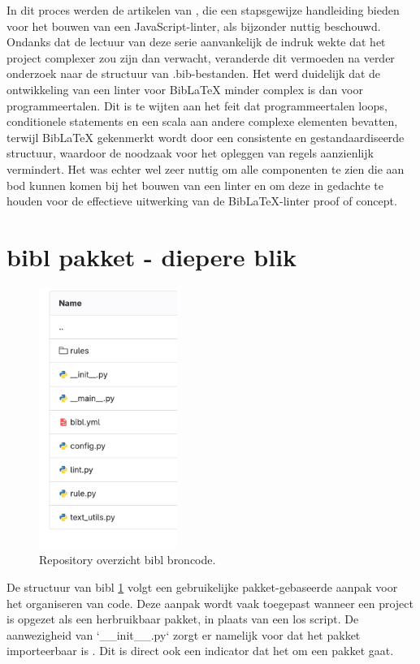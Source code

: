 In dit proces werden de artikelen van \textcite{BorgesLate2021}, die een stapsgewijze handleiding bieden voor het bouwen van een JavaScript-linter, als bijzonder nuttig beschouwd. Ondanks dat de lectuur van deze serie aanvankelijk de indruk wekte dat het project complexer zou zijn dan verwacht, veranderde dit vermoeden na verder onderzoek naar de structuur van .bib-bestanden. Het werd duidelijk dat de ontwikkeling van een linter voor BibLaTeX minder complex is dan voor programmeertalen. Dit is te wijten aan het feit dat programmeertalen loops, conditionele statements en een scala aan andere complexe elementen bevatten, terwijl BibLaTeX gekenmerkt wordt door een consistente en gestandaardiseerde structuur, waardoor de noodzaak voor het opleggen van regels aanzienlijk vermindert. Het was echter wel zeer nuttig om alle componenten te zien die aan bod kunnen komen bij het bouwen van een linter en om deze in gedachte te houden voor de effectieve uitwerking van de BibLaTeX-linter proof of concept.


\section{bibl pakket - diepere blik}
\label{sec:bibl-in-depth}
\begin{figure}[ht]
    \centering
    \includegraphics[width=0.4\textwidth]{./files/bibl_src.png}
    \caption[bibl repository]{Repository overzicht bibl broncode.}
    \label{fig:bibl_src}
\end{figure}

De structuur van bibl \ref{fig:bibl_src} volgt een gebruikelijke pakket-gebaseerde aanpak voor het organiseren van code. Deze aanpak wordt vaak toegepast wanneer een project is opgezet als een herbruikbaar pakket, in plaats van een los script. De aanwezigheid van `\_\_init\_\_.py` zorgt er namelijk voor dat het pakket importeerbaar is \autocite{Loubser2021}. Dit is direct ook een indicator dat het om een pakket gaat.

